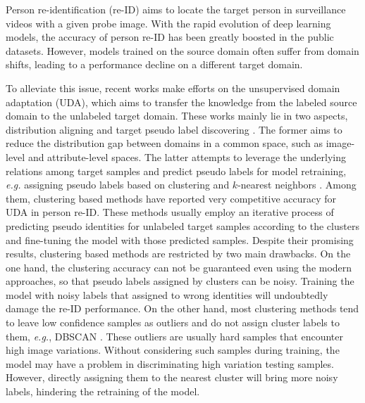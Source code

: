 \documentclass[letterpaper]{article} \usepackage{aaai20}  \usepackage{times}  \usepackage{helvet} \usepackage{courier}  \usepackage[hyphens]{url}  \usepackage{graphicx} \urlstyle{rm} \def\UrlFont{\rm}  \usepackage{graphicx}  \frenchspacing  \setlength{\pdfpagewidth}{8.5in}  \setlength{\pdfpageheight}{11in}  \usepackage{color}
\begin{document}
Person re-identification (re-ID) \cite{sun2018beyond,zheng2016person,li2018harmonious} aims to locate the target person in surveillance videos with a given probe image. With the rapid evolution of deep learning models, the accuracy of person re-ID has been greatly boosted in the public datasets. However, models trained on the source domain often suffer from domain shifts, leading to a performance decline on a different target domain.


To alleviate this issue, recent works \cite{zhong2019learning,zhong2018camstyle} make efforts on the unsupervised domain adaptation (UDA), which aims to transfer the knowledge from the labeled source domain to the unlabeled target domain. These works mainly lie in two aspects, distribution aligning \cite{PTGAN,SPGAN,chang2019disjoint,MMFA,TJAIDL} and target pseudo label discovering \cite{fan2017unsupervised,song2018unsupervised,li2018unsupervised}. The former aims to reduce the distribution gap between domains in a common space, such as image-level \cite{PTGAN,SPGAN} and attribute-level \cite{chang2019disjoint,MMFA,TJAIDL} spaces. The latter attempts to leverage the underlying relations among target samples and predict pseudo labels for model retraining, \textit{e.g.} assigning pseudo labels based on clustering \cite{fan2017unsupervised,song2018unsupervised,li2018unsupervised} and $k$-nearest neighbors \cite{zhong2019invariance,yang2018leveraging}. Among them, clustering based methods have reported very competitive accuracy for UDA in person re-ID. These methods usually employ an iterative process of predicting pseudo identities for unlabeled target samples according to the clusters and fine-tuning the model with those predicted samples. Despite their promising results, clustering based methods are restricted by two main drawbacks. On the one hand, the clustering accuracy can not be guaranteed even using the modern approaches, so that pseudo labels assigned by clusters can be noisy. Training the model with noisy labels that assigned to wrong identities will undoubtedly damage the re-ID performance. On the other hand, most clustering methods tend to leave low confidence samples as outliers and do not assign cluster labels to them, \textit{e.g.}, DBSCAN \cite{ester1996density}. These outliers are usually hard samples that encounter high image variations. Without considering such samples during training, the model may have a problem in discriminating high variation testing samples. However, directly assigning them to the nearest cluster will bring more noisy labels, hindering the retraining of the model. 
\end{document}

